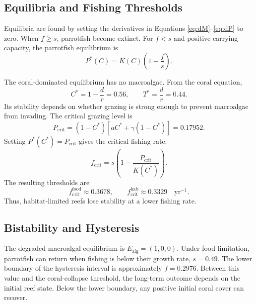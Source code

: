 \documentclass[10pt,a4paper]{article}
\begin{document}
\subsection{Equilibria and Fishing Thresholds}

Equilibria are found by setting the derivatives in Equations \eqref{eq:dM}--\eqref{eq:dP} to zero. When $f\geq s$, parrotfish become extinct. For $f<s$ and positive carrying capacity, the parrotfish equilibrium is
\begin{equation}
    P^*(C)=K(C)\left(1-\frac{f}{s}\right).
    \label{eq:Pstar}
\end{equation}

The coral-dominated equilibrium has no macroalgae. From the coral equation,
\begin{equation}
    C^*=1-\frac{d}{r}=0.56,\qquad T^*=\frac{d}{r}=0.44.
    \label{eq:coraleq}
\end{equation}
Its stability depends on whether grazing is strong enough to prevent macroalgae from invading. The critical grazing level is
\begin{equation}
    P_{\mathrm{crit}}=(1-C^*)[aC^*+\gamma(1-C^*)]=0.17952.
    \label{eq:Pcrit}
\end{equation}
Setting $P^*(C^*)=P_{\mathrm{crit}}$ gives the critical fishing rate:
\begin{equation}
    f_{\mathrm{crit}}=s\left(1-\frac{P_{\mathrm{crit}}}{K(C^*)}\right).
    \label{eq:fcrit}
\end{equation}
The resulting thresholds are
\begin{equation}
    f_{\mathrm{crit}}^{\mathrm{food}}\approx0.3678,\qquad
    f_{\mathrm{crit}}^{\mathrm{hab}}\approx0.3329
    \quad \mathrm{yr}^{-1}.
\end{equation}
Thus, habitat-limited reefs lose stability at a lower fishing rate.

\subsection{Bistability and Hysteresis}

The degraded macroalgal equilibrium is $E_{\mathrm{alg}}=(1,0,0)$. Under food limitation, parrotfish can return when fishing is below their growth rate, $s=0.49$. The lower boundary of the hysteresis interval is approximately $f=0.2976$. Between this value and the coral-collapse threshold, the long-term outcome depends on the initial reef state. Below the lower boundary, any positive initial coral cover can recover.
\end{document}
